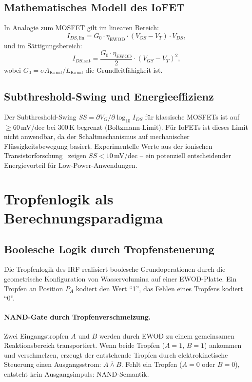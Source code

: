 ﻿\documentclass[a4paper,12pt]{scrreprt}
\theoremstyle{definition}
\begin{document}
\subsection{Mathematisches Modell des IoFET}

In Analogie zum MOSFET gilt im linearen Bereich:
\begin{equation}
  I_{DS,\mathrm{lin}} = G_0 \cdot \eta_{\mathrm{EWOD}} \cdot (V_{GS} - V_T) \cdot V_{DS},
\end{equation}
und im Sättigungsbereich:
\begin{equation}
  I_{DS,\mathrm{sat}} = \frac{G_0 \cdot \eta_{\mathrm{EWOD}}}{2} \cdot (V_{GS} - V_T)^2,
\end{equation}
wobei $G_0 = \sigma A_{\mathrm{Kanal}} / L_{\mathrm{Kanal}}$ die Grundleitfähigkeit ist.

\subsection{Subthreshold-Swing und Energieeffizienz}

Der Subthreshold-Swing $SS = \partial V_G / \partial \log_{10} I_{DS}$ für
klassische MOSFETs ist auf $\geq 60$\,mV/dec bei 300\,K begrenzt (Boltzmann-Limit).
Für IoFETs ist dieses Limit nicht anwendbar, da der Schaltmechanismus auf
mechanischer Flüssigkeitsbewegung basiert. Experimentelle Werte aus der
ionischen Transistorforschung~\cite{xu2021} zeigen $SS < 10$\,mV/dec -- ein
potenziell entscheidender Energievorteil für Low-Power-Anwendungen.

\section{Tropfenlogik als Berechnungsparadigma}

\subsection{Boolesche Logik durch Tropfensteuerung}

Die Tropfenlogik des IRF realisiert boolesche Grundoperationen durch die
geometrische Konfiguration von Wasservolumina auf einer EWOD-Platte.
Ein Tropfen an Position $P_A$ kodiert den Wert ``1'', das Fehlen eines
Tropfens kodiert ``0''.

\paragraph{NAND-Gate durch Tropfenverschmelzung.}
Zwei Eingangstropfen $A$ und $B$ werden durch EWOD zu einem gemeinsamen
Reaktionsbereich transportiert. Wenn beide Tropfen ($A = 1$, $B = 1$) ankommen
und verschmelzen, erzeugt der entstehende Tropfen durch elektrokinetische
Steuerung einen Ausgangsstrom: $\overline{A \wedge B}$. Fehlt ein Tropfen
($A = 0$ oder $B = 0$), entsteht kein Ausgangsimpuls: NAND-Semantik.
\end{document}
